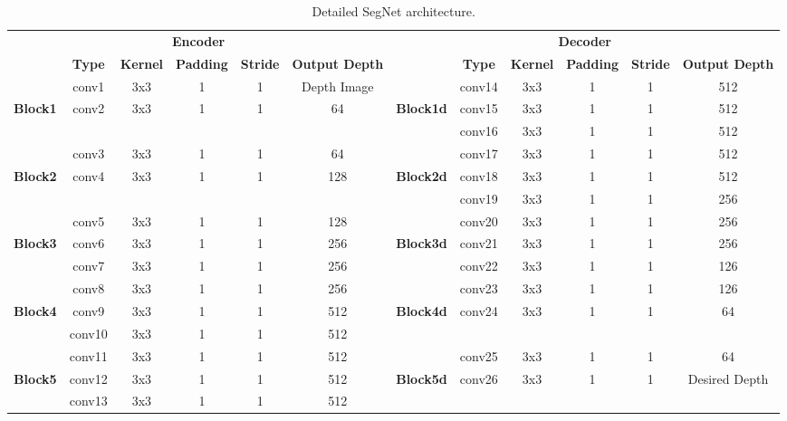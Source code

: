 \begin{table}[h]
	\caption{Detailed SegNet architecture.}
	\centering
	\begin{adjustbox}{width=1\textwidth}
		\begin{tabular}{| c | c  c  c  c  c || c | c  c  c  c  c |}
			
			\toprule
			\multicolumn{6}{|c||}{\textbf{Encoder}}
			&
			\multicolumn{6}{|c|}{\textbf{Decoder}} \\\cline{1-6}\cline{7-12} 
			&\textbf{Type}&\textbf{Kernel}&\textbf{Padding}&\textbf{Stride}&\textbf{Output Depth}& &\textbf{Type}&\textbf{Kernel}&\textbf{Padding}&\textbf{Stride}&\textbf{Output Depth}\\\cline{1-6}\cline{7-12} 
			
			&conv1&3x3&1&1&Depth Image& &conv14&3x3&1&1&512\\
			\textbf{Block1}&conv2&3x3&1&1&64&\textbf{Block1d}&conv15&3x3&1&1&512\\
			& & & & & & &conv16&3x3&1&1&512\\\cline{1-6}\cline{7-12}
			
			&conv3&3x3&1&1&64& &conv17&3x3&1&1&512\\
			\textbf{Block2} &conv4&3x3&1&1&128&\textbf{Block2d}&conv18&3x3&1&1&512\\
			& & & & & & &conv19&3x3&1&1&256\\\cline{1-6}\cline{7-12}
			
			&conv5&3x3&1&1&128& &conv20&3x3&1&1&256\\
			\textbf{Block3}&conv6&3x3&1&1&256&\textbf{Block3d}&conv21&3x3&1&1&256\\
			&conv7&3x3&1&1&256& &conv22&3x3&1&1&126\\\cline{1-6}\cline{7-12}
			
			&conv8&3x3&1&1&256& &conv23&3x3&1&1&126\\
			\textbf{Block4}&conv9&3x3&1&1&512&\textbf{Block4d}&conv24&3x3&1&1&64\\
			&conv10&3x3&1&1&512& & & & & & \\\cline{1-6}\cline{7-12}
			
			&conv11&3x3&1&1&512& &conv25&3x3&1&1&64\\
			\textbf{Block5}&conv12&3x3&1&1&512&\textbf{Block5d}&conv26&3x3&1&1&Desired Depth\\
			&conv13&3x3&1&1&512& & & & & & \\
			\bottomrule
		\end{tabular}
	\end{adjustbox}
	\vspace{0.5ex}
	\label{tab:segnet}
\end{table}


